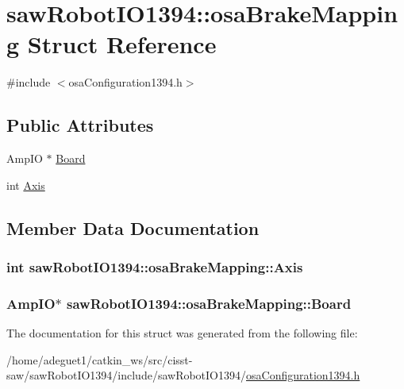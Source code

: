 \hypertarget{structsaw_robot_i_o1394_1_1osa_brake_mapping}{\section{saw\-Robot\-I\-O1394\-:\-:osa\-Brake\-Mapping Struct Reference}
\label{structsaw_robot_i_o1394_1_1osa_brake_mapping}
}


{\ttfamily \#include $<$osa\-Configuration1394.\-h$>$}

\subsection*{Public Attributes}
\begin{DoxyCompactItemize}
\item 
Amp\-I\-O $\ast$ \hyperlink{structsaw_robot_i_o1394_1_1osa_brake_mapping_ac02e89eb743ac2c68da3ac7414a4b522}{Board}
\item 
int \hyperlink{structsaw_robot_i_o1394_1_1osa_brake_mapping_a9dfdbcd06b84554c4b2000789d62e489}{Axis}
\end{DoxyCompactItemize}


\subsection{Member Data Documentation}
\hypertarget{structsaw_robot_i_o1394_1_1osa_brake_mapping_a9dfdbcd06b84554c4b2000789d62e489}{
\subsubsection[{Axis}]{\setlength{\rightskip}{0pt plus 5cm}int saw\-Robot\-I\-O1394\-::osa\-Brake\-Mapping\-::\-Axis}}\label{structsaw_robot_i_o1394_1_1osa_brake_mapping_a9dfdbcd06b84554c4b2000789d62e489}
\hypertarget{structsaw_robot_i_o1394_1_1osa_brake_mapping_ac02e89eb743ac2c68da3ac7414a4b522}{
\subsubsection[{Board}]{\setlength{\rightskip}{0pt plus 5cm}Amp\-I\-O$\ast$ saw\-Robot\-I\-O1394\-::osa\-Brake\-Mapping\-::\-Board}}\label{structsaw_robot_i_o1394_1_1osa_brake_mapping_ac02e89eb743ac2c68da3ac7414a4b522}


The documentation for this struct was generated from the following file\-:\begin{DoxyCompactItemize}
\item 
/home/adeguet1/catkin\-\_\-ws/src/cisst-\/saw/saw\-Robot\-I\-O1394/include/saw\-Robot\-I\-O1394/\hyperlink{osa_configuration1394_8h}{osa\-Configuration1394.\-h}\end{DoxyCompactItemize}
